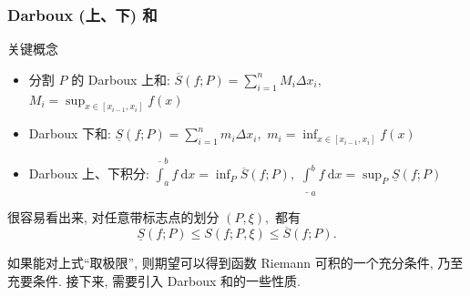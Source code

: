 \begin{frame}
\frametitle{Darboux (上、下) 和}
\begin{block}{关键概念}
\begin{itemize}
\item 分割 $P$ 的 Darboux 上和: $\overline{S}(f; P) = \sum_{i=1}^n M_i\Delta x_i,$ $M_i = \sup_{x \in [x_{i-1}, x_i]} f(x)$
\item Darboux 下和: $\underline{S}(f; P) = \sum_{i=1}^n m_i\Delta x_i,$ $m_i = \inf_{x \in [x_{i-1}, x_i]} f(x)$
\item Darboux 上、下积分: $\overline{\int}_a^b f ~ \mathrm{d} x = \inf_P \overline{S}(f; P),$ $\underline{\int}_a^b f ~ \mathrm{d} x = \sup_P \underline{S}(f; P)$
\end{itemize}
\end{block}

\pause
\vspace{1em}

很容易看出来, 对任意带标志点的划分 $(P, \xi),$ 都有
\[
\underline{S}(f; P) \leqslant S(f; P,\xi) \leqslant \overline{S}(f; P).
\]

\pause

如果能对上式\alert{``取极限''}, 则期望可以得到函数 Riemann 可积的一个充分条件, 乃至\alert{充要条件}. 接下来, 需要引入 Darboux 和的一些性质.


\end{frame}


